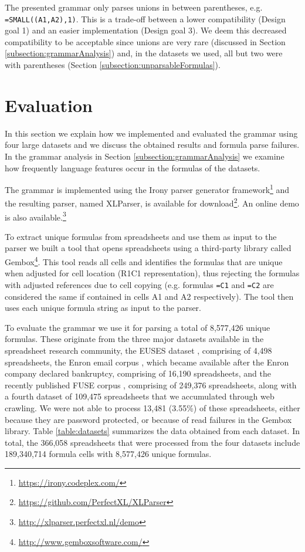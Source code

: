 \documentclass[times]{smrauth}
\begin{document}
The presented grammar only parses unions in between parentheses, e.g. \texttt{=SMALL((A1,A2),1)}.
This is a trade-off between a lower compatibility (Design goal 1) and an easier implementation (Design goal 3).
We deem this decreased compatibility to be acceptable since unions are very rare (discussed in Section \ref{subsection:grammarAnalysis}) and, in the datasets we used, all but two were with parentheses (Section \ref{subsection:unparsableFormulas}).

\section{Evaluation}
\label{sec:evaluation}

In this section we explain how we implemented and evaluated the grammar using four large datasets and we discuss the obtained results and formula parse failures. In the grammar analysis in Section \ref{subsection:grammarAnalysis} we examine how frequently language features occur in the formulas of the datasets.

The grammar is implemented using the Irony parser generator framework\footnote{\url{https://irony.codeplex.com/}} and the resulting parser, named XLParser, is available for download\footnote{\url{https://github.com/PerfectXL/XLParser}}. An online demo is also available.\footnote{\url{http://xlparser.perfectxl.nl/demo}}

To extract unique formulas from spreadsheets and use them as input to the parser we built a tool that opens spreadsheets using a third-party library called Gembox\footnote{\url{http://www.gemboxsoftware.com/}}. This tool reads all cells and identifies the formulas that are unique when adjusted for cell location (R1C1 representation), thus rejecting the formulas with adjusted references due to cell copying (e.g. formulas \texttt{=C1} and \texttt{=C2} are considered the same if contained in cells A1 and A2 respectively). The tool then uses each unique formula string as input to the parser.

To evaluate the grammar we use it for parsing a total of 8,577,426 unique formulas. These originate from the three major datasets available in the spreadsheet research community, the EUSES dataset \cite{euses}, comprising of 4,498 spreadsheets, the Enron email corpus \cite{enron}, which became available after the Enron company declared bankruptcy, comprising of 16,190 spreadsheets, and the recently published FUSE corpus \cite{fuse}, comprising of 249,376 spreadsheets, along with a fourth dataset of 109,475 spreadsheets that we accumulated through web crawling. We were not able to process 13,481 (3.55\%) of these spreadsheets, either because they are password protected, or because of read failures in the Gembox library. Table \ref{table:datasets} summarizes the data obtained from each dataset. In total, the 366,058 spreadsheets that were processed from the four datasets include 189,340,714 formula cells with 8,577,426 unique formulas.
\end{document}
